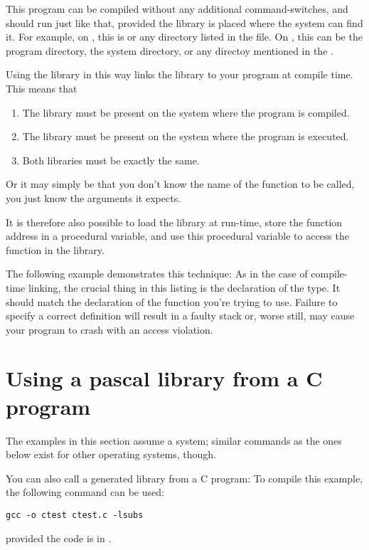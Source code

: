This program can be compiled without any additional command-switches,
and should run just like that, provided the library is placed where
the system can find it. For example, on \linux, this is  or any
directory listed in the  file. On \windows, this
can be the program directory, the \windows system directory, or any directoy
mentioned in the .

Using the library in this way links the library to your program at compile
time. This means that
\begin{enumerate}
\item The library must be present on the system where the program is
compiled.
\item The library must be present on the system where the program is
executed.
\item Both libraries must be exactly the same.
\end{enumerate}
Or it may simply be that you don't know the name of the function to
be called, you just know the arguments it expects.

It is therefore also possible to load the library at run-time, store
the function address in a procedural variable, and use this procedural
variable to access the function in the library.

The following example demonstrates this technique:
As in the case of compile-time linking, the crucial thing in this
listing is the declaration of the  type.
It should match the declaration of the function you're trying to use.
Failure to specify a correct definition will result in a faulty stack or,
worse still, may cause your program to crash with an access violation.

\section{Using a pascal library from a C program}

\begin{remark}The examples in this section assume a \linux system; similar commands
as the ones below exist for other operating systems, though.
\end{remark}

You can also call a \fpc generated library from a C program:
To compile this example, the following command can be used:
\begin{verbatim}
gcc -o ctest ctest.c -lsubs
\end{verbatim}
provided the code is in .


